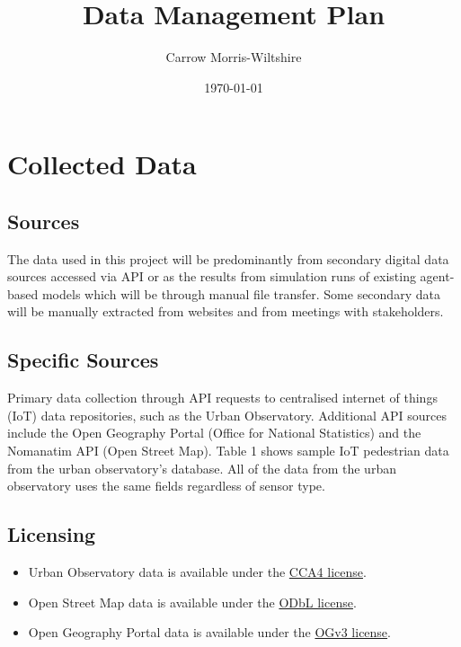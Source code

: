 \documentclass[a4paper, 11pt]{article}
\title{Data Management Plan}
\author{Carrow Morris-Wiltshire}
\date{\today}
\begin{document}
\maketitle

\section{Collected Data}

\subsection{Sources}

The data used in this project will be predominantly from secondary digital data sources accessed via API or as the results from simulation runs of existing agent-based models which will be through manual file transfer. Some secondary data will be manually extracted from websites and from meetings with stakeholders.

\subsection{Specific Sources}

Primary data collection through API requests to centralised internet of things (IoT) data repositories, such as the Urban Observatory. Additional API sources include the Open Geography Portal (Office for National Statistics) and the Nomanatim API (Open Street Map).
Table 1 shows sample IoT pedestrian data from the urban observatory’s database. All of the data from the urban observatory uses the same fields regardless of sensor type.



\subsection{Licensing}

\begin{itemize}
    \item Urban Observatory data is available under the \href{https://creativecommons.org/licenses/by/4.0/}{CCA4 license}.
    \item Open Street Map data is available under the \href{https://opendatacommons.org/licenses/odbl/}{ODbL license}.
    \item Open Geography Portal data is available under the \href{https://www.nationalarchives.gov.uk/doc/open-government-licence/version/3/}{OGv3 license}.
\end{itemize}
\end{document}
